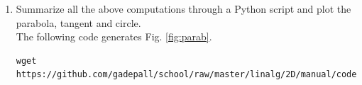 \documentclass[journal,12pt,twocolumn]{IEEEtran}
\renewcommand\thesection{\arabic{section}}
\begin{document}
\begin{enumerate}[label=\thesection.\arabic*
,ref=\thesection.\theenumi]
\begin{align}
\\
\implies \vec{p} &= -\myvec{6 \\ 7}
\end{align}
%
and
\begin{align}
c +\vec{p}^T\vec{u}&= 5
\\
\implies c &= 5+2\myvec{6 & 7}  \myvec{4 \\ 3}
\\
 &= 95
\end{align}
%
\item Summarize all the above computations through a Python script and plot 
the parabola, tangent and circle.
\\
\solution The following code generates Fig. \ref{fig:parab}.
\begin{lstlisting}
wget 
https://github.com/gadepall/school/raw/master/linalg/2D/manual/codes/parab.py
\end{lstlisting}
\begin{figure}[!ht]
\centering

\end{figure}
\end{enumerate}
\end{document}
